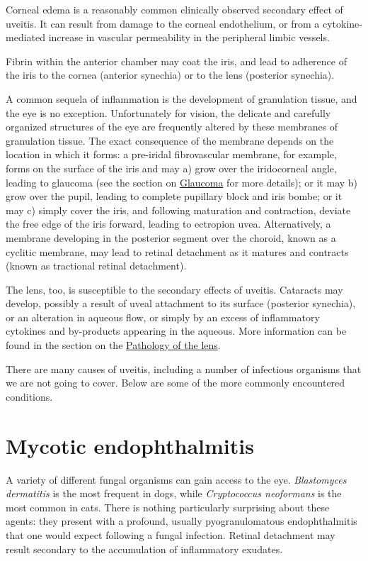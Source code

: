 \documentclass[openany]{book}
\begin{document}
Corneal edema is a reasonably common clinically observed secondary
effect of uveitis. It can result from damage to the corneal endothelium,
or from a cytokine-mediated increase in vascular permeability in the
peripheral limbic vessels.

Fibrin within the anterior chamber may coat the iris, and lead to
adherence of the iris to the cornea (anterior synechia) or to the lens
(posterior synechia).

A common sequela of inflammation is the development of granulation
tissue, and the eye is no exception. Unfortunately for vision, the
delicate and carefully organized structures of the eye are frequently
altered by these membranes of granulation tissue. The exact consequence
of the membrane depends on the location in which it forms: a pre-iridal
fibrovascular membrane, for example, forms on the surface of the iris
and may a) grow over the iridocorneal angle, leading to glaucoma (see
the section on \protect\hyperlink{glaucoma}{Glaucoma} for more details);
or it may b) grow over the pupil, leading to complete pupillary block
and iris bombe; or it may c) simply cover the iris, and following
maturation and contraction, deviate the free edge of the iris forward,
leading to ectropion uvea. Alternatively, a membrane developing in the
posterior segment over the choroid, known as a cyclitic membrane, may
lead to retinal detachment as it matures and contracts (known as
tractional retinal detachment).

The lens, too, is susceptible to the secondary effects of uveitis.
Cataracts may develop, possibly a result of uveal attachment to its
surface (posterior synechia), or an alteration in aqueous flow, or
simply by an excess of inflammatory cytokines and by-products appearing
in the aqueous. More information can be found in the section on the
\protect\hyperlink{pathology-of-the-lens}{Pathology of the lens}.

There are many causes of uveitis, including a number of infectious
organisms that we are not going to cover. Below are some of the more
commonly encountered conditions.

\section{Mycotic endophthalmitis}\label{mycotic-endophthalmitis}

A variety of different fungal organisms can gain access to the eye.
\emph{Blastomyces dermatitis} is the most frequent in dogs, while
\emph{Cryptococcus neoformans} is the most common in cats. There is
nothing particularly surprising about these agents: they present with a
profound, usually pyogranulomatous endophthalmitis that one would expect
following a fungal infection. Retinal detachment may result secondary to
the accumulation of inflammatory exudates.
\end{document}
